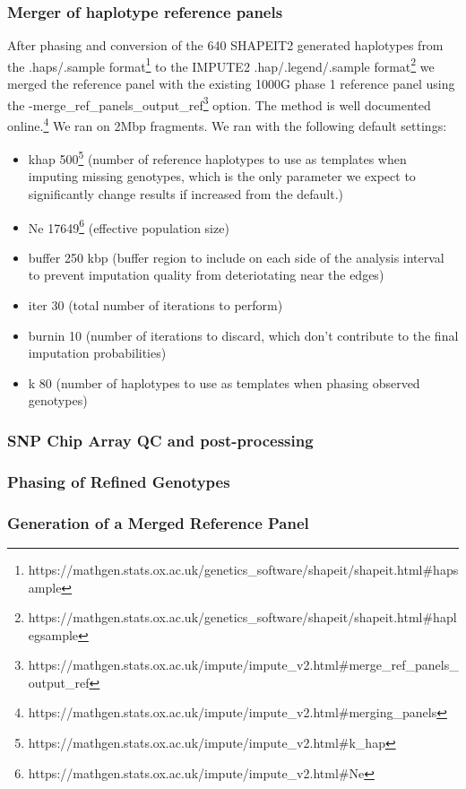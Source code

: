 \subsubsection{Merger of haplotype reference panels}
After phasing and conversion of the 640 SHAPEIT2 generated haplotypes from the .haps/.sample format\footnote{https://mathgen.stats.ox.ac.uk/genetics\_software/shapeit/shapeit.html\#hapsample} to the IMPUTE2 .hap/.legend/.sample format\footnote{https://mathgen.stats.ox.ac.uk/genetics\_software/shapeit/shapeit.html\#haplegsample} we merged the reference panel with the existing \gls{1000G} phase 1 reference panel using the -{}\-merge\_ref\_panels\_output\_ref\footnote{https://mathgen.stats.ox.ac.uk/impute/impute\_v2.html\#\-merge\_ref\_panels\_output\_ref} option.
The method is well documented online.\footnote{https://mathgen.stats.ox.ac.uk/impute/impute\_v2.html\#merging\_panels}
We ran on 2\gls{Mbp} fragments. We ran with the following default settings:
\begin{itemize}
\item \-khap 500\footnote{https://mathgen.stats.ox.ac.uk/impute/impute\_v2.html\#\-k\_hap} (number of reference haplotypes to use as templates when imputing missing genotypes, which is the only parameter we expect to significantly change results if increased from the default.)
\item \-Ne 17649\footnote{https://mathgen.stats.ox.ac.uk/impute/impute\_v2.html\#\-Ne} (effective population size\cite{Wright01031931}\cite{Wright1938})
\item \-buffer 250 \gls{kbp} (buffer region to include on each side of the analysis interval to prevent imputation quality from deteriotating near the edges)
\item \-iter 30 (total number of iterations to perform)
\item \-burnin 10 (number of iterations to discard, which don't contribute to the final imputation probabilities)
\item \-k 80 (number of haplotypes to use as templates when phasing observed genotypes)
\end{itemize}



\subsubsection{SNP Chip Array QC and post-processing}
\subsubsection{Phasing of Refined Genotypes}
\subsubsection{Generation of a Merged Reference Panel}